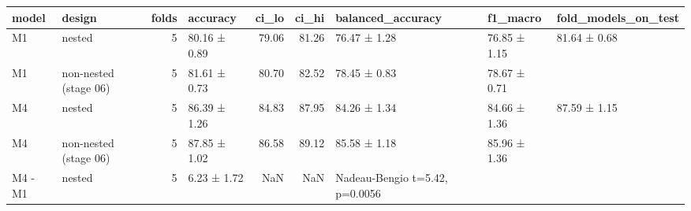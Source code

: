 \begin{tabular}{llrlrrlll}
\toprule
model & design & folds & accuracy & ci\_lo & ci\_hi & balanced\_accuracy & f1\_macro & fold\_models\_on\_test \\
\midrule
M1 & nested & 5 & 80.16 ± 0.89 & 79.06 & 81.26 & 76.47 ± 1.28 & 76.85 ± 1.15 & 81.64 ± 0.68 \\
M1 & non-nested (stage 06) & 5 & 81.61 ± 0.73 & 80.70 & 82.52 & 78.45 ± 0.83 & 78.67 ± 0.71 &  \\
M4 & nested & 5 & 86.39 ± 1.26 & 84.83 & 87.95 & 84.26 ± 1.34 & 84.66 ± 1.36 & 87.59 ± 1.15 \\
M4 & non-nested (stage 06) & 5 & 87.85 ± 1.02 & 86.58 & 89.12 & 85.58 ± 1.18 & 85.96 ± 1.36 &  \\
M4 - M1 & nested & 5 & 6.23 ± 1.72 & NaN & NaN & Nadeau-Bengio t=5.42, p=0.0056 &  &  \\
\bottomrule
\end{tabular}
